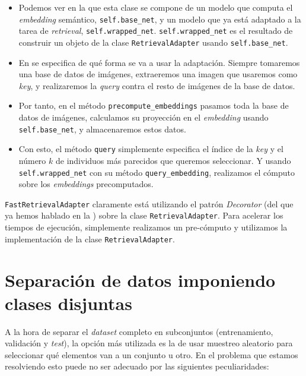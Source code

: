 \begin{itemize}
	\item Podemos ver en la  que esta clase se compone de un modelo que computa el \textit{embedding} semántico, \lstinline{self.base_net}, y un modelo que ya está adaptado a la tarea de \textit{retrieval}, \lstinline{self.wrapped_net}. \lstinline{self.wrapped_net} es el resultado de construir un objeto de la clase \lstinline{RetrievalAdapter} usando \lstinline{self.base_net}.
	\item En  se especifica de qué forma se va a usar la adaptación. Siempre tomaremos una base de datos de imágenes, extraeremos una imagen que usaremos como \textit{key}, y realizaremos la \textit{query} contra el resto de imágenes de la base de datos.
	\item Por tanto, en el método \lstinline{precompute_embeddings} pasamos toda la base de datos de imágenes, calculamos su proyección en el \textit{embedding} usando \lstinline{self.base_net}, y almacenaremos estos datos.
	\item Con esto, el método \lstinline{query} simplemente especifica el índice de la \textit{key} y el número $k$ de individuos más parecidos que queremos seleccionar. Y usando \lstinline{self.wrapped_net} con su método \lstinline{query_embedding}, realizamos el cómputo sobre los \textit{embeddings} precomputados.
\end{itemize}

\begin{sloppypar}
	\lstinline{FastRetrievalAdapter} claramente está utilizando el patrón \textit{Decorator} (del que ya hemos hablado en la ) sobre la clase \lstinline{RetrievalAdapter}. Para acelerar los tiempos de ejecución, simplemente realizamos un pre-cómputo y utilizamos la implementación de la clase \lstinline{RetrievalAdapter}.
\end{sloppypar}

\section{Separación de datos imponiendo clases disjuntas}

A la hora de separar el \textit{dataset} completo en subconjuntos (entrenamiento, validación y \textit{test}), la opción más utilizada es la de usar muestreo aleatorio para seleccionar qué elementos van a un conjunto u otro. En el problema que estamos resolviendo esto puede no ser adecuado por las siguientes peculiaridades:

